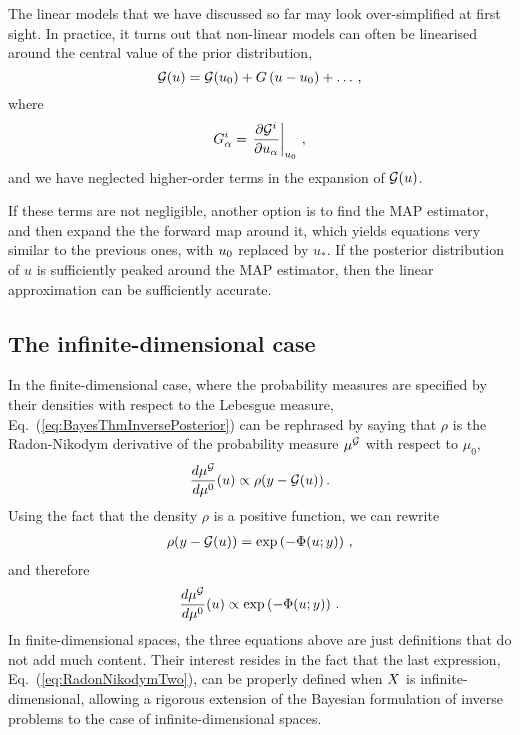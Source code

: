 The linear models that we have discussed so far may look over-simplified at
first sight. In practice, it turns out that non-linear models can often be
linearised around the central value of the prior distribution, 
\begin{equation}
  \label{eq:LinU0}
  \mathcal{G}(u) = \mathcal{G}(u_0) + G \left(u - u_0\right) + \ldots\, ,
\end{equation}
where 
\begin{equation}
  \label{eq:FirstDerU0}
  G^i_\alpha = \left. \frac{\partial \mathcal{G}^i}{\partial u_\alpha} \right|_{u_0}\, ,
\end{equation}
and we have neglected higher-order terms in the expansion of
$\mathcal{G}(u)$.

If these terms are not negligible, another option is to find the MAP estimator,
and then expand the the forward map around it, which yields equations very
similar to the previous ones, with $u_0$ replaced by $u_*$. If the
posterior distribution of $u$ is sufficiently peaked around the
MAP estimator, then the linear approximation can be sufficiently accurate. 


\subsection{The infinite-dimensional case}
\label{sec:infin-dimens-case}

In the finite-dimensional case, where the probability measures are specified by
their densities with respect to the Lebesgue measure,
Eq.~(\ref{eq:BayesThmInversePosterior}) can be rephrased by saying  that $\rho$
is the Radon-Nikodym derivative of the probability measure $\mu^{\mathcal{G}}$ with
respect to $\mu_0$, \viz
\begin{align}
  \label{eq:RadonNikodym}
  \frac{d\mu^{\mathcal{G}}}{d\mu^0} (u) \propto \rho(y-\mathcal{G}(u))\, .
\end{align}
Using the fact that the density $\rho$ is a positive function, we can rewrite 
\begin{align}
  \label{eq:PotentialDef}
  \rho(y-\mathcal{G}(u)) = \exp\left(-\Phi(u;y)\right)\, ,
\end{align}
and therefore
\begin{align}
  \label{eq:RadonNikodymTwo}
  \frac{d\mu^{\mathcal{G}}}{d\mu^0} (u) \propto \exp\left(-\Phi(u;y)\right)\, .
\end{align}
In finite-dimensional spaces, the three equations above are just definitions
that do not add much content. Their interest resides in the fact that the last
expression, Eq.~(\ref{eq:RadonNikodymTwo}), can be properly defined when $X$ is
infinite-dimensional, allowing a rigorous extension of the Bayesian formulation
of inverse problems to the case of infinite-dimensional spaces. 

